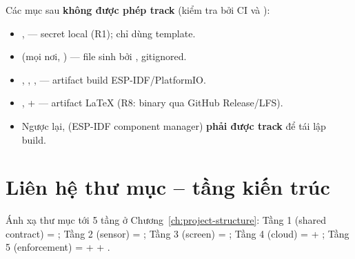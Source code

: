 Các mục sau \textbf{không được phép track} (kiểm tra bởi CI và ):

\begin{itemize}
\item {},  — secret local (R1); chỉ dùng template.
\item {} (mọi nơi, ) — file sinh bởi
  , gitignored.
\item {}, , ,  —
  artifact build ESP-IDF/PlatformIO.
\item {},  +  — artifact
  LaTeX (R8: binary qua GitHub Release/LFS).
\item Ngược lại,  (ESP-IDF component manager) \textbf{phải được
  track} để tái lập build.
\end{itemize}

\section{Liên hệ thư mục -- tầng kiến trúc}
\label{sec:dir-layers}

Ánh xạ thư mục tới 5 tầng ở Chương~\ref{ch:project-structure}:
Tầng 1 (shared contract) = ; Tầng 2 (sensor) =
; Tầng 3 (screen) = ;
Tầng 4 (cloud) =  + ;
Tầng 5 (enforcement) =  +  +
.